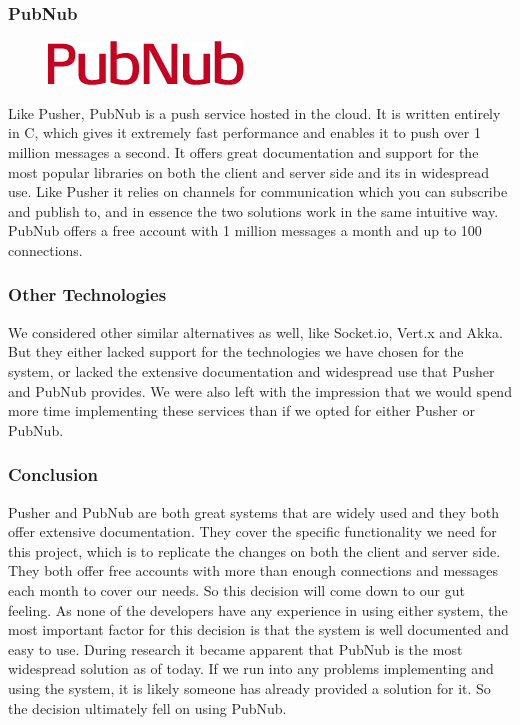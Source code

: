 \subsubsection{PubNub}

\begin{figure}
\centering
\includegraphics[width=.19\textwidth]{image/pubnub-logo.png}
\end{figure}

Like Pusher, PubNub is a push service hosted in the cloud. It is written entirely in C, which gives it extremely fast performance and enables it to push over 1 million messages a second. It offers great documentation and support for the most popular libraries on both the client and server side and its in widespread use. Like Pusher it relies on channels for communication which you can subscribe and publish to, and in essence the two solutions work in the same intuitive way. PubNub offers a free account with 1 million messages a month and up to 100 connections.

\subsubsection{Other Technologies}
We considered other similar alternatives as well, like Socket.io, Vert.x and Akka. But they either lacked support for the technologies we have chosen for the system, or lacked the extensive documentation and widespread use that Pusher and PubNub provides. We were also left with the impression that we would spend more time implementing these services than if we opted for either Pusher or PubNub.

\subsubsection{Conclusion}
Pusher and PubNub are both great systems that are widely used and they both offer extensive documentation. They cover the specific functionality we need for this project, which is to replicate the changes on both the client and server side. They both offer free accounts with more than enough connections and messages each month to cover our needs. So this decision will come down to our gut feeling. As none of the developers have any experience in using either system, the most important factor for this decision is that the system is well documented and easy to use. During research it became apparent that PubNub is the most widespread solution as of today. If we run into any problems implementing and using the system, it is likely someone has already provided a solution for it. So the decision ultimately fell on using PubNub.


